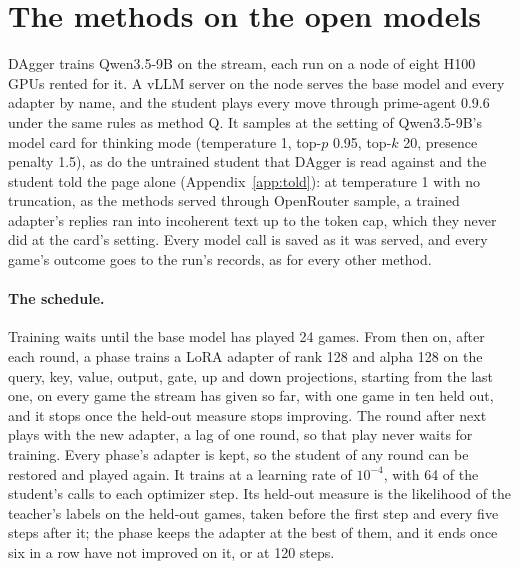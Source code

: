\section{The methods on the open models}
\label{app:trained}

DAgger trains Qwen3.5-9B on the stream, each run on a node of eight H100 GPUs rented for it. A vLLM server on the node serves the base model and every adapter by name, and the student plays every move through prime-agent 0.9.6 under the same rules as method Q. It samples at the setting of Qwen3.5-9B's model card for thinking mode (temperature 1, top-$p$ 0.95, top-$k$ 20, presence penalty 1.5), as do the untrained student that DAgger is read against and the student told the page alone (Appendix~\ref{app:told}): at temperature 1 with no truncation, as the methods served through OpenRouter sample, a trained adapter's replies ran into incoherent text up to the token cap, which they never did at the card's setting. Every model call is saved as it was served, and every game's outcome goes to the run's records, as for every other method.

\paragraph{The schedule.}
Training waits until the base model has played 24 games. From then on, after each round, a phase trains a LoRA adapter \citep{hu2022lora} of rank 128 and alpha 128 on the query, key, value, output, gate, up and down projections, starting from the last one, on every game the stream has given so far, with one game in ten held out, and it stops once the held-out measure stops improving. The round after next plays with the new adapter, a lag of one round, so that play never waits for training. Every phase's adapter is kept, so the student of any round can be restored and played again. It trains at a learning rate of $10^{-4}$, with 64 of the student's calls to each optimizer step. Its held-out measure is the likelihood of the teacher's labels on the held-out games, taken before the first step and every five steps after it; the phase keeps the adapter at the best of them, and it ends once six in a row have not improved on it, or at 120 steps.

